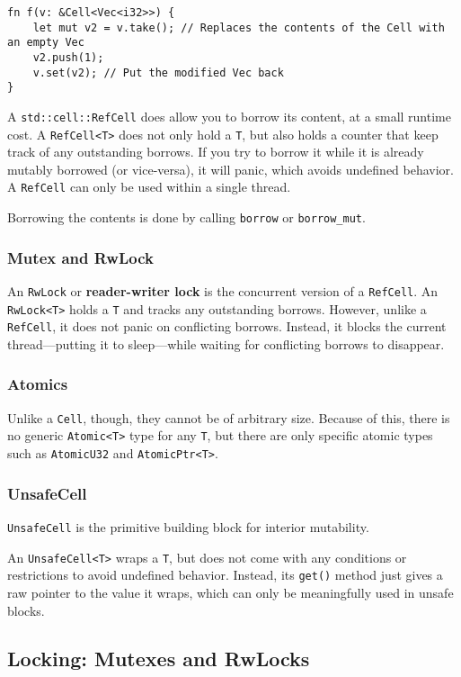 \documentclass[11pt]{article}
\begin{document}
\begin{verbatim}
fn f(v: &Cell<Vec<i32>>) {
    let mut v2 = v.take(); // Replaces the contents of the Cell with an empty Vec
    v2.push(1);
    v.set(v2); // Put the modified Vec back
}
\end{verbatim}

A \texttt{std::cell::RefCell} does allow you to borrow its content, at a small runtime cost. A
\texttt{RefCell<T>} does not only hold a \texttt{T}, but also holds a counter that keep track of any outstanding
borrows. If you try to borrow it while it is already mutably borrowed (or vice-versa), it will
panic, which avoids undefined behavior. A \texttt{RefCell} can only be used within a single thread.

Borrowing the contents is done by calling \texttt{borrow} or \texttt{borrow\_mut}.
\subsubsection{Mutex and RwLock}
\label{sec:orgb666289}
An \texttt{RwLock} or \textbf{reader-writer lock} is the concurrent version of a \texttt{RefCell}. An \texttt{RwLock<T>} holds a \texttt{T}
and tracks any outstanding borrows. However, unlike a \texttt{RefCell}, it does not panic on conflicting
borrows. Instead, it blocks the current thread—putting it to sleep—while waiting for conflicting
borrows to disappear.
\subsubsection{Atomics}
\label{sec:org3c7c8c8}
Unlike a \texttt{Cell}, though, they cannot be of arbitrary size. Because of this, there is no generic
\texttt{Atomic<T>} type for any \texttt{T}, but there are only specific atomic types such as \texttt{AtomicU32} and
\texttt{AtomicPtr<T>}.
\subsubsection{UnsafeCell}
\label{sec:org6a4a6da}
\texttt{UnsafeCell} is the primitive building block for interior mutability.

An \texttt{UnsafeCell<T>} wraps a \texttt{T}, but does not come with any conditions or restrictions to avoid
undefined behavior. Instead, its \texttt{get()} method just gives a raw pointer to the value it wraps,
which can only be meaningfully used in unsafe blocks.
\subsection{Locking: Mutexes and RwLocks}
\label{sec:org26ef606}
\end{document}
